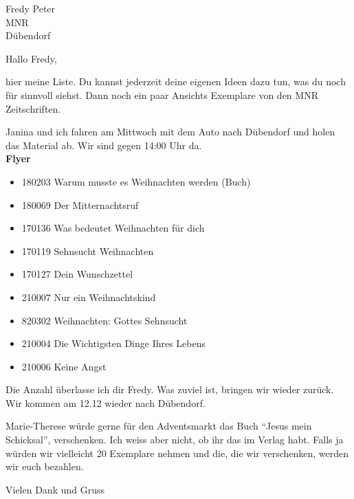 \documentclass[letter]{scrlttr2}
\begin{document}


\begin{letter}{
  Fredy Peter \\
  MNR\\
  Dübendorf
}

\opening{Hallo Fredy,}
    hier meine Liste. Du kannst jederzeit deine eigenen Ideen dazu tun, was du noch für sinnvoll siehst. Dann noch ein paar Ansichts Exemplare von den MNR Zeitschriften.

    Janina und ich fahren am Mittwoch mit dem Auto nach Dübendorf und holen das Material ab. Wir sind gegen 14:00 Uhr da.\\

\textbf{Flyer}

\begin{itemize}  
  \item 180203 Warum musste es Weihnachten werden (Buch)
  \item 180069 Der Mitternachtsruf
  \item 170136 Was bedeutet Weihnachten für dich
  \item 170119 Sehnsucht Weihnachten
  \item 170127 Dein Wunschzettel
  \item 210007 Nur ein Weihnachtskind
  \item 820302 Weihnachten: Gottes Sehnsucht
  \item 210004 Die Wichtigsten Dinge Ihres Lebens
  \item 210006 Keine Angst
\end{itemize}

Die Anzahl überlasse ich dir Fredy. Was zuviel ist, bringen wir wieder zurück. Wir kommen am 12.12 wieder nach Dübendorf.

Marie-Therese würde gerne für den Adventsmarkt das Buch \enquote{Jesus mein Schicksal}, verschenken. Ich weiss aber nicht, ob ihr das im Verlag habt. Falls ja würden wir vielleicht 20 Exemplare nehmen und die, die wir verschenken, werden wir euch bezahlen.


\closing{Vielen Dank und Gruss}

\end{letter}
\end{document}
